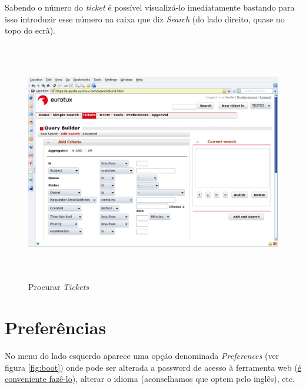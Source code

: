 Sabendo o número do \emph{ticket} é possível visualizá-lo imediatamente bastando para isso introduzir esse número na caixa que diz \emph{Search} (do lado direito, quase no topo do ecrã).

\begin{figure}[H]
\begin{center}
\includegraphics[width=16cm,height=10.5cm]{include/img/rt4}
\end{center}
\caption{Procurar \emph{Tickets}}
\label{fig:rt4}
\end{figure}

\section{Preferências}
No menu do lado esquerdo aparece uma opção denominada \emph{Preferences} (ver figura \ref{fig:boot}) onde pode ser alterada a password de acesso à ferramenta web (\underline{é conveniente fazê-lo}), alterar o idioma (aconselhamos que optem pelo inglês), etc.

